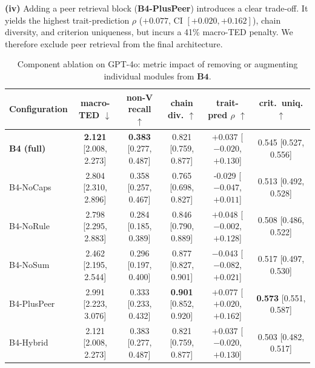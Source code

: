 \documentclass[11pt]{article}
\begin{document}
\textbf{(iv)} Adding a peer retrieval block (\textbf{B4-PlusPeer}) introduces a clear trade-off. It yields the highest trait-prediction $\rho$ ($+0.077$, CI $[+0.020, +0.162]$), chain diversity, and criterion uniqueness, but incurs a 41\% macro-TED penalty. We therefore exclude peer retrieval from the final architecture.

\begin{table}[t]
\centering
\small
\caption{Component ablation on GPT-4o: metric impact of removing or augmenting individual modules from $\textbf{B4}$.}
\label{tab:ablation_results}
\begin{tabular*}{\textwidth}{l @{\extracolsep{\fill}} ccccc}
\toprule
\textbf{Configuration} & \textbf{macro-TED} $\downarrow$ & \textbf{non-V recall} $\uparrow$ & \textbf{chain div.} $\uparrow$ & \textbf{trait-pred $\rho$} $\uparrow$ & \textbf{crit.\ uniq.} $\uparrow$ \\
\midrule
\textbf{B4 (full)}  & \textbf{2.121} \scriptsize{[2.008, 2.273]} & \textbf{0.383} \scriptsize{[0.277, 0.487]} & 0.821 \scriptsize{[0.759, 0.877]} & $+0.037$ \scriptsize{[$-0.020$, $+0.130$]} & 0.545 \scriptsize{[0.527, 0.556]} \\
B4-NoCaps           & 2.804 \scriptsize{[2.310, 2.896]} & 0.358 \scriptsize{[0.257, 0.467]} & 0.765 \scriptsize{[0.698, 0.827]} & -0.029 \scriptsize{[$-0.047$, $+0.011$]} & 0.513 \scriptsize{[0.492, 0.528]} \\
B4-NoRule           & 2.798 \scriptsize{[2.295, 2.883]} & 0.284 \scriptsize{[0.185, 0.389]} & 0.846 \scriptsize{[0.790, 0.889]} & $+0.048$ \scriptsize{[$-0.002$, $+0.128$]} & 0.508 \scriptsize{[0.486, 0.522]} \\
B4-NoSum            & 2.462 \scriptsize{[2.195, 2.544]} & 0.296 \scriptsize{[0.197, 0.400]} & 0.877 \scriptsize{[0.827, 0.901]} & $-0.043$ \scriptsize{[$-0.082$, $+0.021$]} & 0.517 \scriptsize{[0.497, 0.530]} \\
B4-PlusPeer         & 2.991 \scriptsize{[2.223, 3.076]} & 0.333 \scriptsize{[0.233, 0.432]} & \textbf{0.901} \scriptsize{[0.852, 0.920]} & $+0.077$ \scriptsize{[$+0.020$, $+0.162$]} & \textbf{0.573} \scriptsize{[0.551, 0.587]} \\
B4-Hybrid           & 2.121 \scriptsize{[2.008, 2.273]} & 0.383 \scriptsize{[0.277, 0.487]} & 0.821 \scriptsize{[0.759, 0.877]} & $+0.037$ \scriptsize{[$-0.020$, $+0.130$]} & 0.503 \scriptsize{[0.482, 0.517]} \\
\bottomrule
\end{tabular*}
\end{table}
\end{document}
